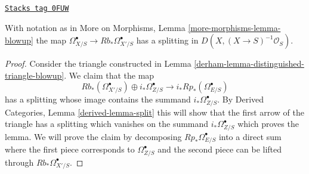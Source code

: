 \begin{proposition}
\label{derham-proposition-blowup-split}
\href{https://stacks.math.columbia.edu/tag/0FUW}{\texttt{Stacks tag 0FUW}}

With notation as in More on Morphisms, Lemma \ref{more-morphisms-lemma-blowup}
the map $\Omega^\bullet_{X/S} \to Rb_*\Omega^\bullet_{X'/S}$
has a splitting in $D(X, (X \to S)^{-1}\mathcal{O}_S)$.
\end{proposition}

\begin{proof}

Consider the triangle constructed in
Lemma \ref{derham-lemma-distinguished-triangle-blowup}.
We claim that the map
$$
Rb_*(\Omega^\bullet_{X'/S}) \oplus i_*\Omega^\bullet_{Z/S} \to
i_*Rp_*(\Omega^\bullet_{E/S})
$$
has a splitting whose image contains the summand $i_*\Omega^\bullet_{Z/S}$.
By Derived Categories, Lemma \ref{derived-lemma-split} this will show that
the first arrow of the triangle has a splitting which vanishes on
the summand $i_*\Omega^\bullet_{Z/S}$ which proves the lemma.
We will prove the claim by decomposing $Rp_*\Omega^\bullet_{E/S}$
into a direct sum where the first piece corresponds to
$\Omega^\bullet_{Z/S}$ and the second piece can be lifted
through $Rb_*\Omega^\bullet_{X'/S}$.


\end{proof}

